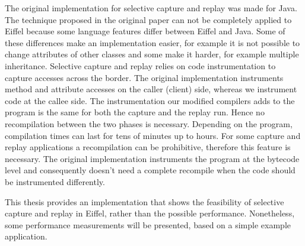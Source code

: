 The original implementation for selective capture and replay was made for Java. The technique proposed in the original paper can not be completely applied to Eiffel because some language features differ between Eiffel and Java. Some of these differences make an implementation easier, for example it is not possible to change attributes of other classes and some make it harder, for example multiple inheritance. Selective capture and replay relies on code instrumentation to capture accesses across the border. The original implementation instruments method and attribute accesses on the caller (client) side, whereas we instrument code at the callee side. The instrumentation our modified compilers adds to the program is the same for both the capture and the replay run. Hence no recompilation between the two phases is necessary. Depending on the program, compilation times can last for tens of minutes up to hours. For some capture and replay applications a recompilation can be prohibitive, therefore this feature is necessary. The original implementation instruments the program at the bytecode level and consequently doesn't need a complete recompile when the code should be instrumented differently.

  This thesis provides an implementation that shows the feasibility of selective capture and replay in Eiffel, rather than the possible performance. Nonetheless, some performance measurements will be presented, based on a simple example application.


